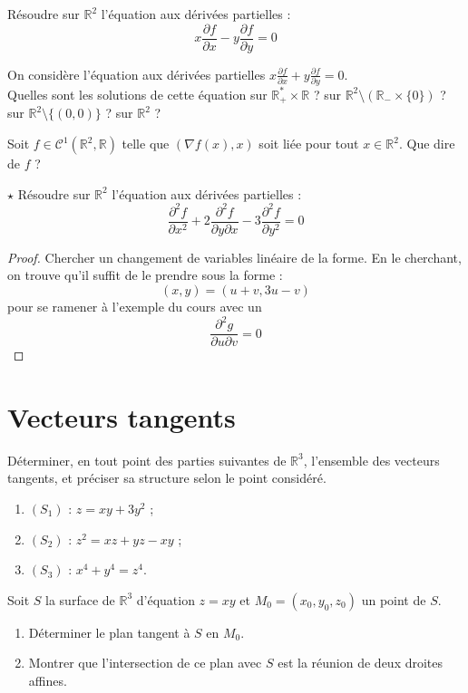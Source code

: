 \documentclass[french,a4paper]{article}
\newcommand{\R}{\mathbb{R}}
\newcommand{\st}{^*}
\theoremstyle{plain}
\theoremstyle{definition}
\theoremstyle{remark}
\begin{document}
\begin{ex}[Moulin.CD.57]{}
	Résoudre sur $\R^2$ l'équation aux dérivées partielles : $$x\frac{\partial f}{\partial x}-y\frac{\partial f}{\partial y}=0$$
\end{ex}

\begin{ex}[Moulin.CD.58]{}
	On considère l'équation aux dérivées partielles $\displaystyle x\frac{\partial f}{\partial x}+y\frac{\partial f}{\partial y}=0$. \\
	Quelles sont les solutions de cette équation sur $\R_+\st\times\R$ ? sur $\R^2\setminus(\R_-\times\{0\})$ ? sur $\R^2\setminus\{(0,0)\}$ ? sur $\R^2$ ?
\end{ex}

\begin{ex}[Moulin.CD.59]{}
	Soit $f\in\mathcal{C}^1(\R^2,\R)$ telle que $(\nabla f(x),x)$ soit liée pour tout $x\in\R^2$. Que dire de $f$ ?
\end{ex}

\begin{ex}[Moulin.CD.60]{$\star$}
	Résoudre sur $\R^2$ l'équation aux dérivées partielles : $$\frac{\partial^2 f}{\partial x^2}+2\frac{\partial^2 f}{\partial y\partial x}-3\frac{\partial^2f}{\partial y^2}=0$$
\end{ex}
\begin{proof}
	Chercher un changement de variables linéaire de la forme. En le cherchant, on trouve qu'il suffit de le prendre sous la forme : $$(x,y)=(u+v,3u-v)$$ pour se ramener à l'exemple du cours avec un $$\frac{\partial^2g}{\partial u\partial v}=0$$
\end{proof}

\section{Vecteurs tangents}

\begin{ex}[Moulin.CD.61]{}
	Déterminer, en tout point des parties suivantes de $\R^3$, l'ensemble des vecteurs tangents, et préciser sa structure selon le point considéré.
	\begin{enumerate}
		\item $(S_1)$ : $z=xy+3y^2$ ;
		\item $(S_2)$ : $z^2=xz+yz-xy$ ;
		\item $(S_3)$ : $x^4+y^4=z^4$.
	\end{enumerate}
\end{ex}

\begin{ex}[Moulin.CD.62]{}
	Soit $S$ la surface de $\R^3$ d'équation $z=xy$ et $M_0=(x_0,y_0,z_0)$ un point de $S$.
	\begin{enumerate}
		\item Déterminer le plan tangent à $S$ en $M_0$.
		\item Montrer que l'intersection de ce plan avec $S$ est la réunion de deux droites affines.
	\end{enumerate}
\end{ex}
\end{document}
